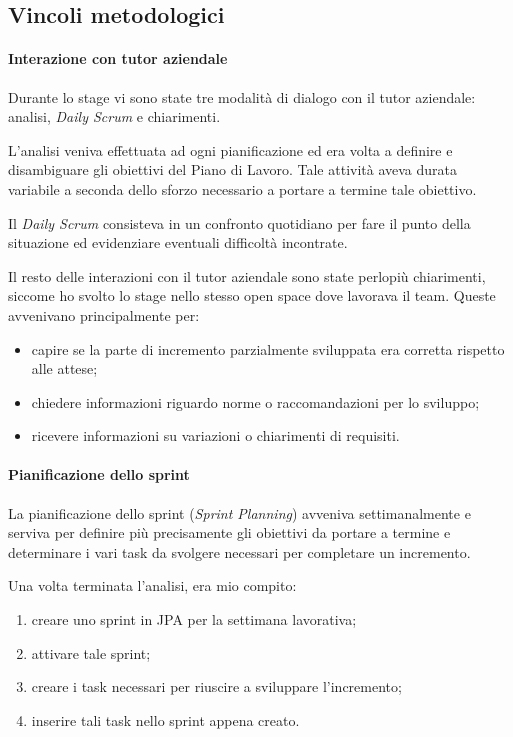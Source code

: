 \subsection{Vincoli metodologici}

\paragraph{Interazione con tutor aziendale} \mbox{}

Durante lo stage vi sono state tre modalità di dialogo con il tutor aziendale:
analisi, \emph{Daily Scrum} e chiarimenti.

L'analisi veniva effettuata ad ogni pianificazione ed era volta a definire e
disambiguare gli obiettivi del Piano di Lavoro. Tale attività aveva durata
variabile a seconda dello sforzo necessario a portare a termine tale obiettivo.

Il \emph{Daily Scrum} consisteva in un confronto quotidiano per fare il punto
della situazione ed evidenziare eventuali difficoltà incontrate.

Il resto delle interazioni con il tutor aziendale sono state perlopiù
chiarimenti, siccome ho svolto lo stage nello stesso open space dove lavorava
il team. Queste avvenivano principalmente per:

\begin{itemize}
\item capire se la parte di incremento parzialmente sviluppata era corretta
  rispetto alle attese;
\item chiedere informazioni riguardo norme o raccomandazioni per lo sviluppo;
\item ricevere informazioni su variazioni o chiarimenti di requisiti.
\end{itemize}

\paragraph{Pianificazione dello sprint} \mbox{}

La pianificazione dello sprint (\emph{Sprint Planning}) avveniva
settimanalmente e serviva per definire più precisamente gli obiettivi da portare a termine e determinare i vari task da svolgere necessari per
completare un incremento.

Una volta terminata l'analisi, era mio compito:

\begin{enumerate}
\item creare uno sprint in JPA per la settimana lavorativa;
\item attivare tale sprint;
\item creare i task necessari per riuscire a sviluppare l'incremento;
\item inserire tali task nello sprint appena creato.
\end{enumerate}


